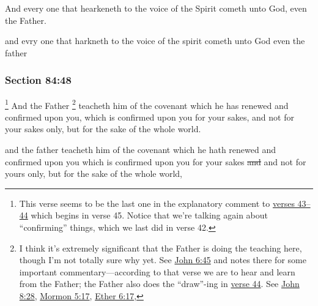 		And every one that hearkeneth to the voice of the Spirit cometh unto God, even the Father.

		\begin{framed}
		\scriptsize
			\begin{compactdesc}
				\item[JSP] and evry one that harkneth to the voice of the spirit cometh unto God even the father
			\end{compactdesc}
		\end{framed}

	\subsubsection{Section 84:48} %
		\label{DC84-48}

			\footnote{%
				This verse seems to be the last one in the explanatory comment to \hyperref[DC84-43]{verses 43--44} which begins in verse 45. Notice that we're talking again about ``confirming'' things, which we last did in verse 42.
				}%
		And the Father%
			\footnote{%
				I think it's extremely significant that the Father is doing the teaching here, though I'm not totally sure why yet. See \hyperref[JOHN-6-45]{John 6:45} and notes there for some important commentary---according to that verse we are to hear and learn from the Father; the Father also does the ``draw''-ing in \hyperref[JOHN-6-44]{verse 44}. See \hyperref[JOHN-8-28]{John 8:28}, \hyperref[MORMON-5-17]{Mormon 5:17}, \hyperref[ETHER-6-17]{Ether 6:17}, 
				}
		teacheth him of the covenant which he has renewed and confirmed upon you, which is confirmed upon you for your sakes, and not for your sakes only, but for the sake of the whole world.

		\begin{framed}
		\scriptsize
			\begin{compactdesc}
				\item[JSP] and the father teacheth him of the covenant which he hath renewed and confirmed upon you which is confirmed upon you for your sakes \sout{and} and not for yours only, but for the sake of the whole world,
			\end{compactdesc}
		\end{framed}

